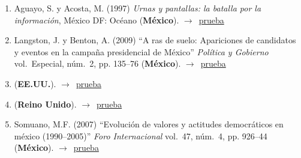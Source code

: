 \documentclass[12 pt, letter]{article}
\newenvironment{CitasMiTrabajo}{
    \begin{footnotesize}
    \begin{enumerate}[label={\footnotesize\emph{cita~\arabic*}},ref=\arabic*] %
        \setlength{\itemsep}{.1\itemsep}
        \setlength{\parskip}{.1\parskip}
    }{\end{enumerate}\end{footnotesize}}
\begin{document}

        \begin{CitasMiTrabajo}

        \item Aguayo, S. y Acosta, M. (1997) \emph{Urnas y pantallas: la batalla por la informaci\'on}, 
        M\'exico DF: Oc\'eano (\textbf{M\'exico}). $\rightarrow$~\href{https://github.com/emagar/cv/blob/master/citasMiTrab/magarMolinar/aguayoUrnasPantallas.pdf}{prueba}

        \item Langston, J. y Benton, A. (2009) ``A ras de suelo: Apariciones de candidatos y eventos en la campa\~na presidencial de M\'exico'' \emph{Pol\'itica y Gobierno} vol.\ Especial, n\'um.\ 2, pp. 135--76 (\textbf{M\'exico}). $\rightarrow$~\href{https://github.com/emagar/cv/blob/master/citasMiTrab/magarMolinar/langston+Benton2009pyg.pdf}{prueba}

        \item {} (\textbf{EE.UU.}). $\rightarrow$~\href{https://www.tandfonline.com/doi/ref/10.1080/13510340008403672?scroll=top}{prueba}
          
        \item {} (\textbf{Reino Unido}). $\rightarrow$~\href{https://link.springer.com/chapter/10.1007/978-3-319-56032-8_4}{prueba}

        \item Somuano, M.F. (2007) ``Evoluci\'on de valores y actitudes democr\'aticos en m\'exico (1990--2005)''
            \emph{Foro Internacional} vol.\ 47, n\'um.\ 4, pp. 926--44 (\textbf{M\'exico}). $\rightarrow$~\href{https://github.com/emagar/cv/blob/master/citasMiTrab/magarMolinar/somuano2007fi.pdf}{prueba}

        \label{ncites:magar.molinar.1995} %


        \end{CitasMiTrabajo}
\end{document}
